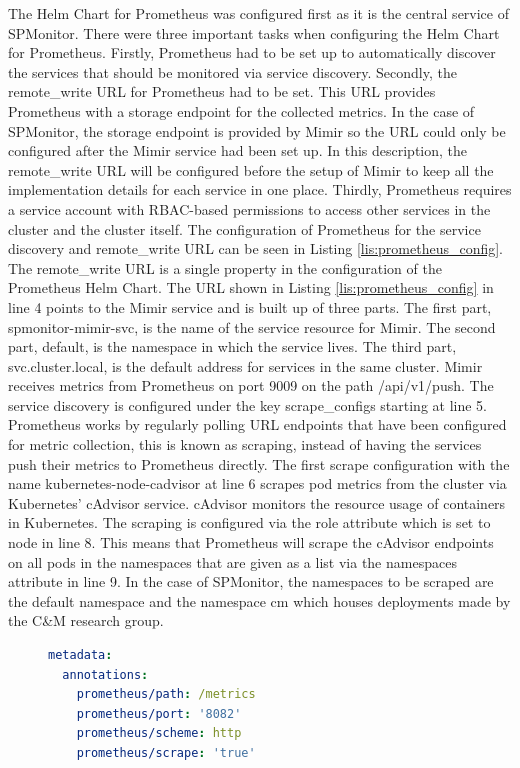 The Helm Chart for Prometheus \cite{PRO-HELM} was configured first as it is the central service
of SPMonitor. There were three important tasks when configuring the Helm Chart
for Prometheus. Firstly, Prometheus had to be set up to automatically discover
the services that should be monitored via service discovery. Secondly,
the remote\_write URL for Prometheus had to be set. This URL provides Prometheus
with a storage endpoint for the collected metrics. In the case of SPMonitor,
the storage endpoint is provided by Mimir so the URL could only be configured
after the Mimir service had been set up. In this description, the remote\_write URL
will be configured before the setup of Mimir to keep all the implementation details
for each service in one place. Thirdly, Prometheus requires a service account with RBAC-based permissions to
access other services in the cluster and the cluster itself.
The configuration of Prometheus for the service discovery and remote\_write URL can
be seen in Listing \ref{lis:prometheus_config}.
The remote\_write URL is a single property in the configuration of the Prometheus
Helm Chart. The URL shown in Listing \ref{lis:prometheus_config} in line 4 points to the Mimir service
and is built up of three parts. The first part, spmonitor-mimir-svc, is the name
of the service resource for Mimir. The second part, default, is the namespace in which
the service lives. The third part, svc.cluster.local, is the default address
for services in the same cluster. Mimir receives metrics from Prometheus on port 9009
on the path /api/v1/push.
The service discovery is configured under the key scrape\_configs starting at line 5.
Prometheus works by regularly polling URL endpoints that have been configured
for metric collection, this is known as scraping, instead of having the services
push their metrics to Prometheus directly. The first scrape configuration with the name
kubernetes-node-cadvisor at line 6 scrapes pod metrics from the cluster via Kubernetes' cAdvisor service.
cAdvisor monitors the resource usage of containers in Kubernetes. The scraping is configured
via the role attribute which is set to node in line 8. This means that Prometheus will scrape the cAdvisor
endpoints on all pods in the namespaces that are given as a list via the namespaces attribute in line 9.
In the case of SPMonitor, the namespaces to be scraped are the default namespace and the namespace cm
which houses deployments made by the C\&M research group.

\begin{figure}[tb]
\begin{lstlisting}[caption = {Scrapable Endpoint Configuration for Prometheus}, label = {lis:scrape_endpoint_configuration}, style = kit-cm, language=yaml]
metadata:
  annotations:
    prometheus/path: /metrics
    prometheus/port: '8082'
    prometheus/scheme: http
    prometheus/scrape: 'true'
\end{lstlisting}
\end{figure}

